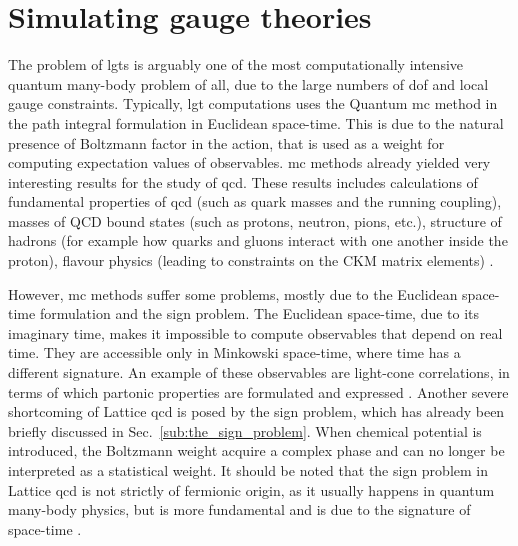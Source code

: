 \section{Simulating gauge theories}
\label{sec:simulating_gauge_theories}


The problem of \ac{lgt}s is arguably one of the most computationally intensive quantum many-body problem of all, due to the large numbers of \ac{dof} and local gauge constraints.
Typically, \ac{lgt} computations uses the Quantum \ac{mc} method in the path integral formulation in Euclidean space-time.
This is due to the natural presence of Boltzmann factor in the action, that is used as a weight for computing expectation values of observables.
\ac{mc} methods already yielded very interesting results for the study of \ac{qcd}.
These results includes calculations of fundamental properties of \ac{qcd} (such as quark masses and the running coupling), masses of QCD bound states (such as protons, neutron, pions, etc.), structure of hadrons (for example how quarks and gluons interact with one another inside the proton), flavour physics (leading to constraints on the CKM matrix elements) \cite{banuls2020lgtreview}.

However, \ac{mc} methods suffer some problems, mostly due to the Euclidean space-time formulation and the sign problem.
The Euclidean space-time, due to its imaginary time, makes it impossible to compute observables that depend on real time.
They are accessible only in Minkowski space-time, where time has a different signature.
An example of these observables are light-cone correlations, in terms of which partonic properties are formulated and expressed \cite{cichy2019lightcone}.
Another severe shortcoming of Lattice \ac{qcd} is posed by the sign problem, which has already been briefly discussed in Sec.~\ref{sub:the_sign_problem}.
When chemical potential is introduced, the Boltzmann weight acquire a complex phase and can no longer be interpreted as a statistical weight.
It should be noted that the sign problem in Lattice \ac{qcd} is not strictly of fermionic origin, as it usually happens in quantum many-body physics, but is more fundamental and is due to the signature of space-time \cite{banuls2020lgtreview}.

